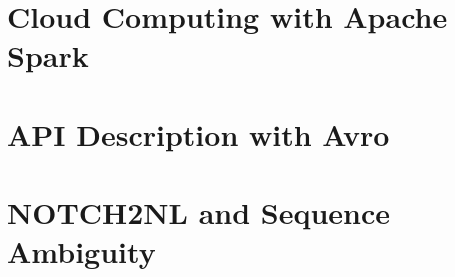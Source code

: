 \documentclass[11pt,proposal]{ucthesis}
\begin{document}
\section{Cloud Computing with Apache Spark}

\section{API Description with Avro}


        
        
        
        
    
    
    

\section{NOTCH2NL and Sequence Ambiguity}
    
    
    
    
    
    
\end{document}
